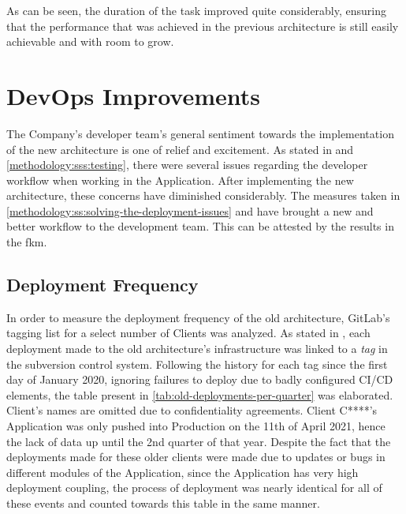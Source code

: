 As can be seen, the duration of the task improved quite considerably, ensuring that the performance that was achieved in the previous architecture is still easily achievable and with room to grow.







\section{DevOps Improvements}\label{results-and-discussion:s:devops-improvements}

The Company's developer team's general sentiment towards the implementation of the new architecture is one of relief and excitement. As stated in  and \cref{methodology:sss:testing}, there were several issues regarding the developer workflow when working in the Application. After implementing the new architecture, these concerns have diminished considerably. The measures taken in \cref{methodology:ss:solving-the-deployment-issues} and  have brought a new and better workflow to the development team. This can be attested by the results in the \gls{fkm}.

\subsection{Deployment Frequency}\label{results-and-discussion:ss:deployment}

In order to measure the deployment frequency of the old architecture, GitLab's tagging list for a select number of Clients was analyzed. As stated in , each deployment made to the old architecture's infrastructure was linked to a \textit{tag} in the subversion control system. Following the history for each tag since the first day of January 2020, ignoring failures to deploy due to badly configured CI/CD elements, the table present in \cref{tab:old-deployments-per-quarter} was elaborated. Client's names are omitted due to confidentiality agreements. Client C****'s Application was only pushed into Production on the 11th of April 2021, hence the lack of data up until the 2nd quarter of that year. Despite the fact that the deployments made for these older clients were made due to updates or bugs in different modules of the Application, since the Application has very high deployment coupling, the process of deployment was nearly identical for all of these events and counted towards this table in the same manner.

